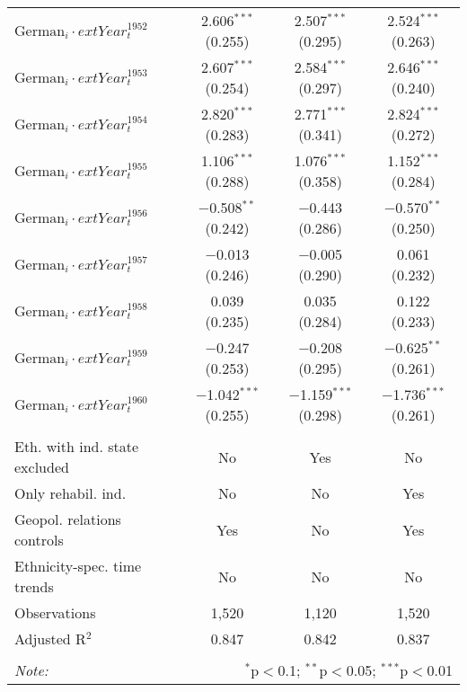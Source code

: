 \begin{table}[!h]
\begin{tabular}{@{\extracolsep{5pt}}lccc}
  $\text{German}_{i} \cdot 	ext{Year}_{t}^1952$ & 2.606$^{***}$ (0.255) & 2.507$^{***}$ (0.295) & 2.524$^{***}$ (0.263) \\ 
  $\text{German}_{i} \cdot 	ext{Year}_{t}^1953$ & 2.607$^{***}$ (0.254) & 2.584$^{***}$ (0.297) & 2.646$^{***}$ (0.240) \\ 
  $\text{German}_{i} \cdot 	ext{Year}_{t}^1954$ & 2.820$^{***}$ (0.283) & 2.771$^{***}$ (0.341) & 2.824$^{***}$ (0.272) \\ 
  $\text{German}_{i} \cdot 	ext{Year}_{t}^1955$ & 1.106$^{***}$ (0.288) & 1.076$^{***}$ (0.358) & 1.152$^{***}$ (0.284) \\ 
  $\text{German}_{i} \cdot 	ext{Year}_{t}^1956$ & $-$0.508$^{**}$ (0.242) & $-$0.443 (0.286) & $-$0.570$^{**}$ (0.250) \\ 
  $\text{German}_{i} \cdot 	ext{Year}_{t}^1957$ & $-$0.013 (0.246) & $-$0.005 (0.290) & 0.061 (0.232) \\ 
  $\text{German}_{i} \cdot 	ext{Year}_{t}^1958$ & 0.039 (0.235) & 0.035 (0.284) & 0.122 (0.233) \\ 
  $\text{German}_{i} \cdot 	ext{Year}_{t}^1959$ & $-$0.247 (0.253) & $-$0.208 (0.295) & $-$0.625$^{**}$ (0.261) \\ 
  $\text{German}_{i} \cdot 	ext{Year}_{t}^1960$ & $-$1.042$^{***}$ (0.255) & $-$1.159$^{***}$ (0.298) & $-$1.736$^{***}$ (0.261) \\ 
 \hline \\[-1.8ex] 
Eth. with ind. state excluded & No & Yes & No \\ 
Only rehabil. ind. & No & No & Yes \\ 
Geopol. relations controls & Yes & No & Yes \\ 
Ethnicity-spec. time trends & No & No & No \\ 
Observations & 1,520 & 1,120 & 1,520 \\ 
Adjusted R$^{2}$ & 0.847 & 0.842 & 0.837 \\ 
\hline 
\hline \\[-1.8ex] 
\textit{Note:}  & \multicolumn{3}{r}{$^{*}$p$<$0.1; $^{**}$p$<$0.05; $^{***}$p$<$0.01} \\ 
\end{tabular} 
\end{table} 
